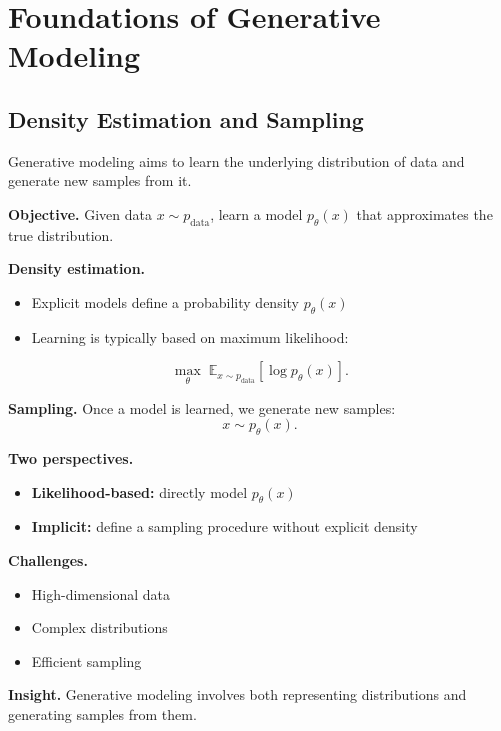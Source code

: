 \chapter{Foundations of Generative Modeling}

\section{Density Estimation and Sampling}

Generative modeling aims to learn the underlying distribution of data and generate new samples from it.

\medskip

\noindent
\textbf{Objective.}  
Given data $x \sim p_{\text{data}}$, learn a model $p_\theta(x)$ that approximates the true distribution.

\medskip

\noindent
\textbf{Density estimation.}
\begin{itemize}
    \item Explicit models define a probability density $p_\theta(x)$
    \item Learning is typically based on maximum likelihood:
\end{itemize}

\[
\max_\theta \; \mathbb{E}_{x \sim p_{\text{data}}}[\log p_\theta(x)].
\]

\medskip

\noindent
\textbf{Sampling.}  
Once a model is learned, we generate new samples:
\[
x \sim p_\theta(x).
\]

\medskip

\noindent
\textbf{Two perspectives.}
\begin{itemize}
    \item \textbf{Likelihood-based:} directly model $p_\theta(x)$
    \item \textbf{Implicit:} define a sampling procedure without explicit density
\end{itemize}

\medskip

\noindent
\textbf{Challenges.}
\begin{itemize}
    \item High-dimensional data
    \item Complex distributions
    \item Efficient sampling
\end{itemize}

\medskip

\noindent
\textbf{Insight.}  
Generative modeling involves both representing distributions and generating samples from them.

